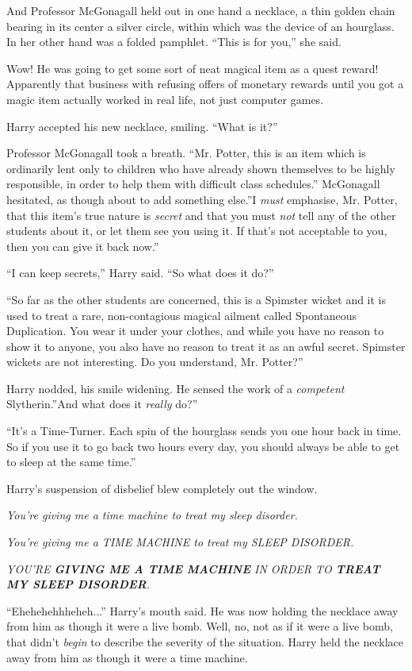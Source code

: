 And Professor McGonagall held out in one hand a necklace, a thin golden
chain bearing in its center a silver circle, within which was the device
of an hourglass. In her other hand was a folded pamphlet. ``This is for
you,'' she said.

Wow! He was going to get some sort of neat magical item as a quest
reward! Apparently that business with refusing offers of monetary
rewards until you got a magic item actually worked in real life, not
just computer games.

Harry accepted his new necklace, smiling. ``What is it?''

Professor McGonagall took a breath. ``Mr. Potter, this is an item which
is ordinarily lent only to children who have already shown themselves to
be highly responsible, in order to help them with difficult class
schedules.'' McGonagall hesitated, as though about to add something
else.''I \emph{must} emphasise, Mr. Potter, that this item's true nature
is \emph{secret} and that you must \emph{not} tell any of the other
students about it, or let them see you using it. If that's not
acceptable to you, then you can give it back now.''

``I can keep secrets,'' Harry said. ``So what does it do?''

``So far as the other students are concerned, this is a Spimster wicket
and it is used to treat a rare, non-contagious magical ailment called
Spontaneous Duplication. You wear it under your clothes, and while you
have no reason to show it to anyone, you also have no reason to treat it
as an awful secret. Spimster wickets are not interesting. Do you
understand, Mr. Potter?''

Harry nodded, his smile widening. He sensed the work of a
\emph{competent} Slytherin.''And what does it \emph{really} do?''

``It's a Time-Turner. Each spin of the hourglass sends you one hour back
in time. So if you use it to go back two hours every day, you should
always be able to get to sleep at the same time.''

Harry's suspension of disbelief blew completely out the window.

\emph{You're giving me a time machine to treat my sleep disorder.}

\emph{You're giving me a TIME MACHINE to treat my SLEEP DISORDER.}

\emph{YOU'RE \textbf{GIVING ME A TIME MACHINE} IN ORDER TO \textbf{TREAT
MY SLEEP DISORDER}.}

``Ehehehehhheheh...'' Harry's mouth said. He was now holding the
necklace away from him as though it were a live bomb. Well, no, not as
if it were a live bomb, that didn't \emph{begin} to describe the
severity of the situation. Harry held the necklace away from him as
though it were a time machine.


